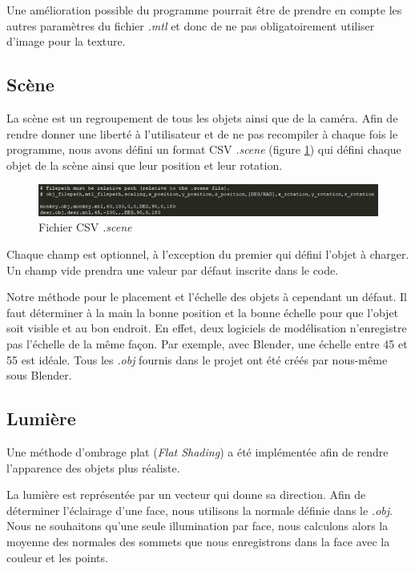             Une amélioration possible du programme pourrait être de prendre en compte les autres paramètres du fichier \emph{.mtl} et donc de ne pas obligatoirement utiliser d'image pour la texture.

        \subsection{Scène}

            La scène est un regroupement de tous les objets ainsi que de la caméra. Afin de rendre donner une liberté à l'utilisateur et de ne pas recompiler à chaque fois le programme, nous avons défini un format CSV \emph{.scene} (figure \ref{fig:scene}) qui défini chaque objet de la scène ainsi que leur position et leur rotation.

            \begin{figure}[h]
                \centering
                \includegraphics[scale=0.8]{img/rendu/scene.png}
                \caption{Fichier CSV \emph{.scene}}
                \label{fig:scene}
            \end{figure}

            Chaque champ est optionnel, à l'exception du premier qui défini l'objet à charger. Un champ vide prendra une valeur par défaut inscrite dans le code.

            Notre méthode pour le placement et l'échelle des objets à cependant un défaut. Il faut déterminer à la main la bonne position et la bonne échelle pour que l'objet soit visible et au bon endroit. En effet, deux logiciels de modélisation n'enregistre pas l'échelle de la même façon. Par exemple, avec Blender, une échelle entre 45 et 55 est idéale. Tous les \emph{.obj} fournis dans le projet ont été créés par nous-même sous Blender.

        \subsection{Lumière}
        \label{subsubsec:lumiere}

        Une méthode d'ombrage plat (\textit{Flat Shading}) a été implémentée afin de rendre l'apparence des objets plus réaliste.

        La lumière est représentée par un vecteur qui donne sa direction. Afin de déterminer l'éclairage d'une face, nous utilisons la normale définie dans le \emph{.obj}. Nous ne souhaitons qu'une seule illumination par face, nous calculons alors la moyenne des normales des sommets que nous enregistrons dans la face avec la couleur et les points. 


